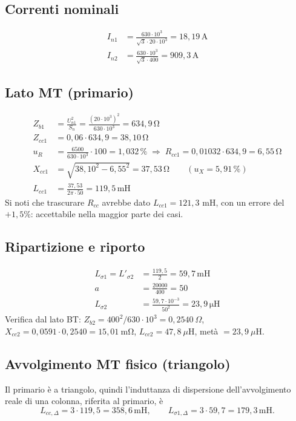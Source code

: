 \documentclass[11pt,a4paper]{article}
\newcommand{\un}[1]{\,\mathrm{#1}}
\begin{document}
\subsection*{Correnti nominali}
\begin{align}
I_{n1} &= \frac{630\cdot 10^3}{\sqrt{3}\cdot 20\cdot 10^3} = 18{,}19\un{A}\\
I_{n2} &= \frac{630\cdot 10^3}{\sqrt{3}\cdot 400} = 909{,}3\un{A}
\end{align}

\subsection*{Lato MT (primario)}
\begin{align}
Z_{b1} &= \frac{U_{n1}^2}{S_n} = \frac{(20\cdot10^3)^2}{630\cdot10^3} = 634{,}9\un{\Omega}\\
Z_{cc1} &= 0{,}06\cdot 634{,}9 = 38{,}10\un{\Omega}\\
u_R &= \frac{6500}{630\cdot10^3}\cdot100 = 1{,}032\,\% \;\Rightarrow\;
R_{cc1} = 0{,}01032\cdot634{,}9 = 6{,}55\un{\Omega}\\
X_{cc1} &= \sqrt{38{,}10^2-6{,}55^2} = 37{,}53\un{\Omega}
\qquad (u_X = 5{,}91\,\%)\\
L_{cc1} &= \frac{37{,}53}{2\pi\cdot 50} = 119{,}5\un{mH}
\end{align}
Si noti che trascurare $R_{cc}$ avrebbe dato $L_{cc1}=121{,}3$ mH, con un errore del
$+1{,}5\%$: accettabile nella maggior parte dei casi.

\subsection*{Ripartizione e riporto}
\begin{align}
L_{\sigma 1} = L'_{\sigma 2} &= \frac{119{,}5}{2} = 59{,}7\un{mH}\\
a &= \frac{20000}{400} = 50\\
L_{\sigma 2} &= \frac{59{,}7\cdot10^{-3}}{50^2} = 23{,}9\un{\mu H}
\end{align}
Verifica dal lato BT: $Z_{b2}=400^2/630\cdot10^3 = 0{,}2540\ \Omega$,
$X_{cc2}=0{,}0591\cdot0{,}2540 = 15{,}01\ \mathrm{m\Omega}$,
$L_{cc2}=47{,}8\ \mu\mathrm{H}$, metà $=23{,}9\ \mu$H. \checkmark

\subsection*{Avvolgimento MT fisico (triangolo)}
Il primario è a triangolo, quindi l'induttanza di dispersione dell'avvolgimento reale di
una colonna, riferita al primario, è
\begin{equation}
L_{cc,\Delta} = 3\cdot 119{,}5 = 358{,}6\un{mH},
\qquad L_{\sigma 1,\Delta} = 3\cdot 59{,}7 = 179{,}3\un{mH}.
\end{equation}
\end{document}
